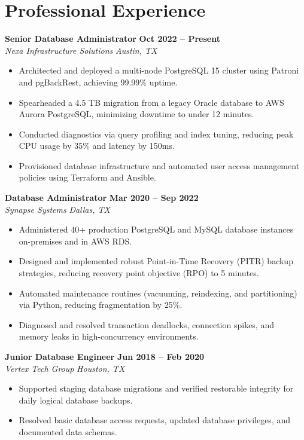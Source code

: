 \documentclass[10pt]{article}
\newcommand{\jobentry}[4]{
    \vspace{0.2em}
    \noindent\textbf{#1} \hfill \color{secondary}\textbf{#2} \\
    \noindent\textit{#3} \hfill \color{secondary}\textit{#4}
    \vspace{0.05em}
}
\begin{document}
\section*{Professional Experience}

\jobentry{Senior Database Administrator}{Oct 2022 -- Present}{Nexa Infrastructure Solutions}{Austin, TX}
\begin{itemize}[leftmargin=1.35em, nosep, topsep=0.05em, itemsep=0.1em]
    \item Architected and deployed a multi-node PostgreSQL 15 cluster using Patroni and pgBackRest, achieving 99.99\% uptime.
    \item Spearheaded a 4.5 TB migration from a legacy Oracle database to AWS Aurora PostgreSQL, minimizing downtime to under 12 minutes.
    \item Conducted diagnostics via query profiling and index tuning, reducing peak CPU usage by 35\% and latency by 150ms.
    \item Provisioned database infrastructure and automated user access management policies using Terraform and Ansible.
\end{itemize}

\jobentry{Database Administrator}{Mar 2020 -- Sep 2022}{Synapse Systems}{Dallas, TX}
\begin{itemize}[leftmargin=1.35em, nosep, topsep=0.05em, itemsep=0.1em]
    \item Administered 40+ production PostgreSQL and MySQL database instances on-premises and in AWS RDS.
    \item Designed and implemented robust Point-in-Time Recovery (PITR) backup strategies, reducing recovery point objective (RPO) to 5 minutes.
    \item Automated maintenance routines (vacuuming, reindexing, and partitioning) via Python, reducing fragmentation by 25\%.
    \item Diagnosed and resolved transaction deadlocks, connection spikes, and memory leaks in high-concurrency environments.
\end{itemize}

\jobentry{Junior Database Engineer}{Jun 2018 -- Feb 2020}{Vertex Tech Group}{Houston, TX}
\begin{itemize}[leftmargin=1.35em, nosep, topsep=0.05em, itemsep=0.1em]
    \item Supported staging database migrations and verified restorable integrity for daily logical database backups.
    \item Resolved basic database access requests, updated database privileges, and documented data schemas.
\end{itemize}
\end{document}
